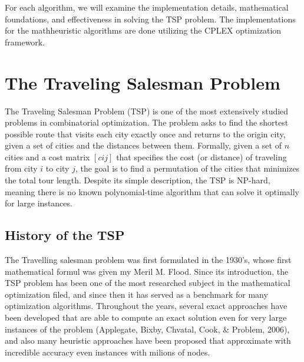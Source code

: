 \documentclass{article}
\begin{document}
For each algorithm, we will examine the implementation details, mathematical foundations, and effectiveness in solving the TSP problem. 
The implementations for the mathheuristic algorithms are done utilizing the CPLEX optimization framework. 

\newpage

\section{The Traveling Salesman Problem}
The Traveling Salesman Problem (TSP) is one of the most extensively studied problems in combinatorial optimization. The problem asks to find the shortest possible route that visits each city exactly once and returns to the origin city, 
given a set of cities and the distances between them.
Formally, given a set of $n$ cities and a cost matrix $[cij]$ that specifies the cost (or distance) of traveling from city $i$ to city $j$, the goal is to find a permutation of the cities that minimizes the total tour length. 
Despite its simple description, the TSP is NP-hard, meaning there is no known polynomial-time algorithm that can solve it optimally for large instances.

\subsection{History of the TSP}
The Travelling salesman problem was first formulated in the 1930's, whose first mathematical formul was given my Meril M. Flood.
Since its introduction, the TSP problem has been one of the most researched subject in the mathematical optimization filed, and since then it has served
as a benchmark for many optimization algorithms.
Throughout the years, several exact approaches have been developed that are able to compute an exact solution even for very large instances of 
the problem (Applegate, Bixby, Chvatal, Cook, \& Problem, 2006), and also many heuristic approaches have been proposed that approximate with incredible 
accuracy even instances with milions of nodes.  
\end{document}
